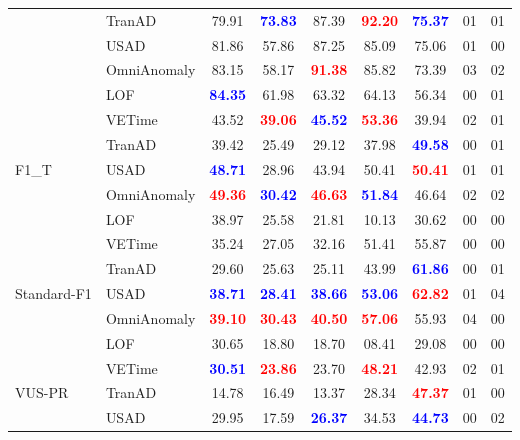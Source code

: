 \documentclass{article}
\theoremstyle{plain}
\theoremstyle{definition}
\theoremstyle{remark}
\begin{document}
\begin{table}[t!]
\begin{tabular}{l|l|ccccc|c|c}
    & TranAD & 79.91 & \textcolor{blue}{\textbf{73.83}} & 87.39 & \textcolor{red}{\textbf{92.20}} & \textcolor{blue}{\textbf{75.37}} & 01 & 01 \\
    & USAD & 81.86 & 57.86 & 87.25 & 85.09 & 75.06 & 01 & 00 \\
    & OmniAnomaly & 83.15 & 58.17 & \textcolor{red}{\textbf{91.38}} & 85.82 & 73.39 & 03 & 02 \\
    & LOF & \textcolor{blue}{\textbf{84.35}} & 61.98 & 63.32 & 64.13 & 56.34 & 00 & 01 \\
    \hline
    \multirow{5}{*}{F1\_T} 
    & VETime & 43.52& \textcolor{red}{\textbf{39.06}} & \textcolor{blue}{\textbf{45.52}} & \textcolor{red}{\textbf{53.36}} & 39.94 & 02 & 01 \\
    & TranAD & 39.42 & 25.49 & 29.12 & 37.98 & \textcolor{blue}{\textbf{49.58}} & 00 & 01 \\
    & USAD & \textcolor{blue}{\textbf{48.71}} & 28.96 & 43.94 & 50.41 & \textcolor{red}{\textbf{50.41}} & 01 & 01 \\
    & OmniAnomaly & \textcolor{red}{\textbf{49.36}} & \textcolor{blue}{\textbf{30.42}} & \textcolor{red}{\textbf{46.63}} & \textcolor{blue}{\textbf{51.84}} & 46.64 & 02 & 02 \\
    & LOF & 38.97 & 25.58 & 21.81 & 10.13 & 30.62 & 00 & 00 \\
    \hline
    \multirow{5}{*}{Standard-F1} 
     & VETime & 35.24 & 27.05 & 32.16 & 51.41 & 55.87 & 00 & 00 \\
    & TranAD & 29.60 & 25.63 & 25.11 & 43.99 & \textcolor{blue}{\textbf{61.86}} & 00 & 01 \\
    & USAD & \textcolor{blue}{\textbf{38.71}} & \textcolor{blue}{\textbf{28.41}} & \textcolor{blue}{\textbf{38.66}} & \textcolor{blue}{\textbf{53.06}} & \textcolor{red}{\textbf{62.82}} & 01 & 04 \\
    & OmniAnomaly & \textcolor{red}{\textbf{39.10}} & \textcolor{red}{\textbf{30.43}} & \textcolor{red}{\textbf{40.50}} & \textcolor{red}{\textbf{57.06}} & 55.93 & 04 & 00 \\
    & LOF & 30.65 & 18.80 & 18.70 & 08.41 & 29.08 & 00 & 00 \\
    \hline
    \multirow{5}{*}{VUS-PR} 
    & VETime & \textcolor{blue}{\textbf{30.51}} & \textcolor{red}{\textbf{23.86}} & 23.70 & \textcolor{red}{\textbf{48.21}} & 42.93 & 02 & 01 \\
    & TranAD & 14.78 & 16.49 & 13.37 & 28.34 & \textcolor{red}{\textbf{47.37}} & 01 & 00 \\
    & USAD & 29.95 & 17.59 & \textcolor{blue}{\textbf{26.37}} & 34.53 & \textcolor{blue}{\textbf{44.73}} & 00 & 02 \\

\end{tabular}
\end{table}
\end{document}
